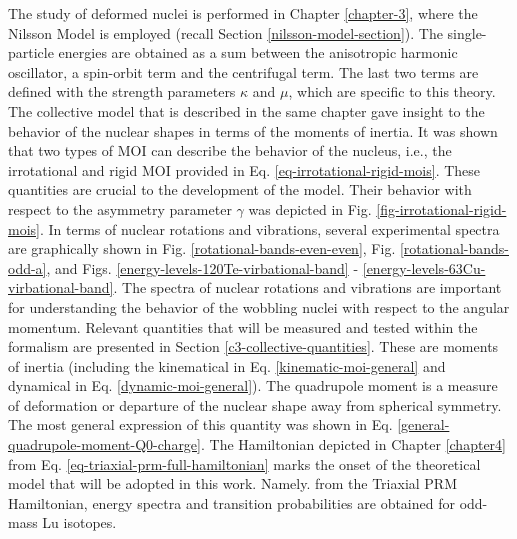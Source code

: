 The study of deformed nuclei is performed in Chapter \ref{chapter-3}, where the Nilsson Model is employed (recall Section \ref{nilsson-model-section}). The single-particle energies are obtained as a sum between the anisotropic harmonic oscillator, a spin-orbit term and the centrifugal term. The last two terms are defined with the strength parameters $\kappa$ and $\mu$, which are specific to this theory. The collective model that is described in the same chapter gave insight to the behavior of the nuclear shapes in terms of the moments of inertia. It was shown that two types of MOI can describe the behavior of the nucleus, i.e., the irrotational and rigid MOI provided in Eq. \ref{eq-irrotational-rigid-mois}. These quantities are crucial to the development of the model. Their behavior with respect to the asymmetry parameter $\gamma$ was depicted in Fig. \ref{fig-irrotational-rigid-mois}. In terms of nuclear rotations and vibrations, several experimental spectra are graphically shown in Fig. \ref{rotational-bands-even-even}, Fig. \ref{rotational-bands-odd-a}, and Figs. \ref{energy-levels-120Te-virbational-band} - \ref{energy-levels-63Cu-virbational-band}. The spectra of nuclear rotations and vibrations are important for understanding the behavior of the wobbling nuclei with respect to the angular momentum. Relevant quantities that will be measured and tested within the formalism are presented in Section \ref{c3-collective-quantities}. These are moments of inertia (including the kinematical in Eq. \ref{kinematic-moi-general} and dynamical in Eq. \ref{dynamic-moi-general}). The quadrupole moment is a measure of deformation or departure of the nuclear shape away from spherical symmetry. The most general expression of this quantity was shown in Eq. \ref{general-quadrupole-moment-Q0-charge}. The Hamiltonian depicted in Chapter \ref{chapter4} from Eq. \ref{eq-triaxial-prm-full-hamiltonian} marks the onset of the theoretical model that will be adopted in this work. Namely. from the Triaxial PRM Hamiltonian, energy spectra and transition probabilities are obtained for odd-mass Lu isotopes.

